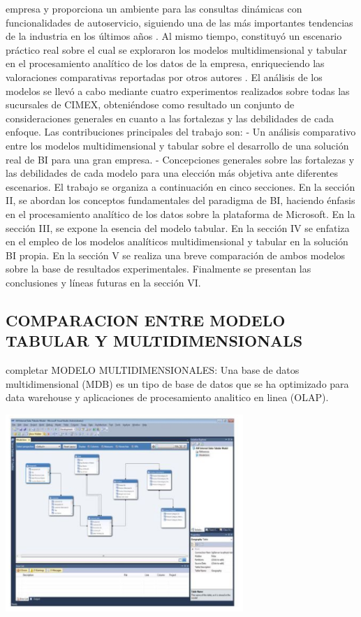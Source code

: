 \documentclass[%
 reprint,
 amsmath,amssymb,
 aps,
]{revtex4-1}
\begin{document}
empresa y proporciona un ambiente para las consultas
dinámicas con funcionalidades de autoservicio, siguiendo una
de las más importantes tendencias de la industria en los
últimos años . Al mismo tiempo, constituyó un escenario
práctico real sobre el cual se exploraron los modelos
multidimensional y tabular en el procesamiento analítico de
los datos de la empresa, enriqueciendo las valoraciones
comparativas reportadas por otros autores . El
análisis de los modelos se llevó a cabo mediante cuatro
experimentos realizados sobre todas las sucursales de CIMEX,
obteniéndose como resultado un conjunto de consideraciones
generales en cuanto a las fortalezas y las debilidades de cada
enfoque.
Las contribuciones principales del trabajo son:
- Un análisis comparativo entre los modelos
multidimensional y tabular sobre el desarrollo de una
solución real de BI para una gran empresa.
- Concepciones generales sobre las fortalezas y las
debilidades de cada modelo para una elección más
objetiva ante diferentes escenarios.
El trabajo se organiza a continuación en cinco secciones.
En la sección II, se abordan los conceptos fundamentales del
paradigma de BI, haciendo énfasis en el procesamiento
analítico de los datos sobre la plataforma de Microsoft. En la
sección III, se expone la esencia del modelo tabular. En la
sección IV se enfatiza en el empleo de los modelos analíticos
multidimensional y tabular en la solución BI propia. En la
sección V se realiza una breve comparación de ambos
modelos sobre la base de resultados experimentales.
Finalmente se presentan las conclusiones y líneas futuras en la
sección VI. 

\subsection{COMPARACION ENTRE MODELO TABULAR Y MULTIDIMENSIONALS}	
completar
MODELO MULTIDIMENSIONALES:
Una base de datos multidimensional (MDB) es un tipo de base de datos que se ha optimizado para data warehouse y aplicaciones de procesamiento analitico en linea (OLAP).

\begin{center}
	\includegraphics[width=9cm]{./Imagenes/1a}
\end{center}
\end{document}

